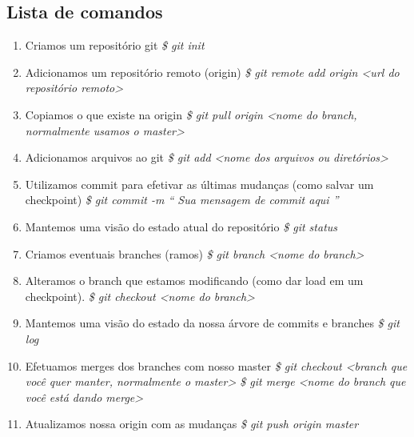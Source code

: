 \documentclass[12pt]{article}
\begin{document}
\begin{doublespacing}
\subsection{Lista de comandos}
\label{comandos}
\begin{enumerate}

\item{Criamos um repositório git \newline
\textit{\$ git init}
}  
\item{Adicionamos um repositório remoto (origin) \newline
\textit{\$ git remote add origin <url do repositório remoto>}
}

\item{Copiamos o que existe na origin \newline
\textit{\$ git pull origin <nome do branch, normalmente usamos o master> }
}
\item{Adicionamos arquivos ao git \newline
\textit{\$ git add <nome dos arquivos ou diretórios>}
}
\item{Utilizamos commit para efetivar as últimas mudanças (como salvar um checkpoint) \newline
\textit{\$ git commit -m “ Sua mensagem de commit aqui ”}
}
\item{Mantemos uma visão do estado atual do repositório \newline
\textit{\$ git status}
}
\item{Criamos eventuais branches (ramos) \newline
\textit{\$ git branch <nome do branch>}
}
\item{Alteramos o branch que estamos modificando (como dar load em um checkpoint). \newline
	\textit{\$ git checkout <nome do branch>  }
}
\item{Mantemos uma visão do estado da nossa árvore de commits e branches \newline
\textit{\$ git log}
}
\item{Efetuamos merges dos branches com nosso master \newline
	\textit{\$ git checkout <branch que você quer manter, normalmente o master> \newline
    \$ git merge <nome do branch que você está dando merge>}
}
\item{Atualizamos nossa origin com as mudanças \newline
	\textit{\$ git push origin master}
}
\end{enumerate}


\end{doublespacing}
\end{document}
